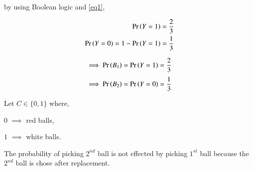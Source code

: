 \documentclass[journal,12pt,twocolumn]{IEEEtran}
\begin{document}
by using Boolean logic and \eqref{eq1},

\begin{align}
    \Pr\left(Y=1\right)=\frac{2}{3}\\
    \Pr\left(Y=0\right)=1-\Pr\left(Y=1\right)=\frac{1}{3}
\end{align}

\begin{align}\label{eq2}
    \implies\Pr\left(B_1\right)=\Pr\left(Y=1\right)=\frac{2}{3}
\end{align}
\begin{align}\label{eq3}
    \implies\Pr\left(B_2\right)=\Pr\left(Y=0\right)=\frac{1}{3}
\end{align}

Let $C \in \{0,1\}$ where, 

$0$ $\implies$ red balls,

$1$ $\implies$ white balls.

\begin{table}[h!]
\centering
\caption{Table of number of balls}
\label{table1}
\end{table}

\begin{table}[h!]
\centering
\caption{Table of probability of taking balls from each box}
\label{Table2}
\end{table}

The probability of picking $2^{nd}$ ball is not effected by picking $1^{st}$ ball because the $2^{nd}$ ball is chose after replacement.
\end{document}
